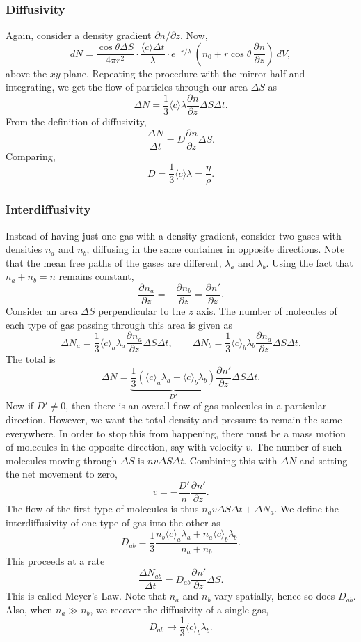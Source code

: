 \documentclass[11pt]{article}
\newcommand\pp[3][]{\frac{\partial^{#1}{#2}}{\partial {#3}^{#1}}}
\newcommand\E[1]{\langle #1 \rangle}
\theoremstyle{definition}
\theoremstyle{remark}
\numberwithin{equation}{section}
\begin{document}
    \subsubsection{Diffusivity}
    Again, consider a density gradient $\partial n / \partial z$. Now, \[
        dN = \frac{\cos\theta \Delta S}{4\pi r^2}\cdot \frac{\E{c}\Delta
        t}{\lambda}\cdot e^{-r / \lambda}\,\left(n_0 +
        r\cos\theta\,\pp{n}{z}\right)\:dV,
    \] above the $xy$ plane. Repeating the procedure with the mirror half and
    integrating, we get the flow of particles through our area $\Delta S$ as \[
        \Delta N = \frac{1}{3}\E{c}\lambda \pp{n}{z}\Delta S \Delta t.
    \] From the definition of diffusivity, \[
        \frac{\Delta N}{\Delta t} = D \pp{n}{z}\Delta S.
    \] Comparing, \[
        D = \frac{1}{3}\E{c}\lambda = \frac{\eta}{\rho}.
    \] 


    \subsubsection{Interdiffusivity}
    Instead of having just one gas with a density gradient, consider two gases with
    densities $n_a$ and $n_b$, diffusing in the same container in opposite directions.
    Note that the mean free paths of the gases are different, $\lambda_a$ and
    $\lambda_b$. Using the fact that $n_a + n_b = n$ remains constant, \[
        \pp{n_a}{z} = -\pp{n_b}{z} = \pp{n'}{z}.
    \] Consider an area $\Delta S$ perpendicular to the $z$ axis. The number of
    molecules of each type of gas passing through this area is given as \[
        \Delta N_a = \frac{1}{3}\E{c}_a\lambda_a \pp{n_a}{z}\Delta S \Delta t, \qquad
        \Delta N_b = \frac{1}{3}\E{c}_b\lambda_b \pp{n_a}{z}\Delta S \Delta t.
    \] The total is \[
        \Delta N = \underbrace{\frac{1}{3}\left(\E{c}_a\lambda_a -
        \E{c}_b\lambda_b\right)}_{D'}\pp{n'}{z}\Delta S \Delta t.
    \] Now if $D' \neq 0$, then there is an overall flow of gas molecules in a
    particular direction. However, we want the total density and pressure to remain
    the same everywhere. In order to stop this from happening, there must be a mass
    motion of molecules in the opposite direction, say with velocity $v$. The number
    of such molecules moving through $\Delta S$ is $nv\Delta S \Delta t$. Combining
    this with $\Delta N$ and setting the net movement to zero, \[
        v = -\frac{D'}{n}\pp{n'}{z}.
    \] The flow of the first type of molecules is thus $n_av\Delta S\Delta t + 
    \Delta N_a$. We define the interdiffusivity of one type of gas into the other as \[
        D_{ab} = \frac{1}{3} \frac{n_b\E{c}_a\lambda_a + n_a\E{c}_b\lambda_b}{n_a +
        n_b}.
    \] This proceeds at a rate \[
        \frac{\Delta N_{ab}}{\Delta t} = D_{ab}\pp{n'}{z}\Delta S.
    \] This is called Meyer's Law. Note that $n_a$ and $n_b$ vary spatially, hence
    so does $D_{ab}$. Also, when $n_a \gg n_b$, we recover the diffusivity of a
    single gas, \[
        D_{ab} \to \frac{1}{3}\E{c}_b\lambda_b.
    \]
\end{document}
